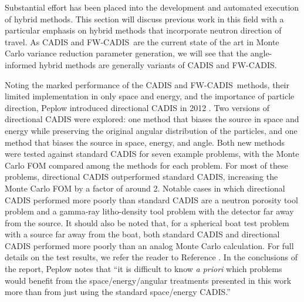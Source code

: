 \documentclass{article} %
\newcommand{\fwc}{\mbox{FW-CADIS}}
\begin{document}
Substantial effort has been placed into the development and automated
execution of hybrid methods. This section will discuss previous work in this
field with a  particular emphasis on hybrid methods  that incorporate neutron
direction of travel. As CADIS and \fwc\ are the current state of the art in
Monte Carlo variance reduction parameter generation, we will see that the
angle-informed hybrid methods are generally variants of CADIS and \fwc.

Noting the marked performance of the CADIS and \fwc\ methods, their limited
implementation in only space and energy, and the importance of particle
direction, Peplow introduced directional CADIS in 2012 \cite{peplow}. Two
versions of directional CADIS were explored: one method that biases the source
in space and energy while preserving the original angular distribution of the
particles, and one method that biases the source in space, energy, and angle.
Both new methods were tested against standard CADIS for seven example
problems, with the Monte Carlo FOM compared among the methods for each
problem. For most of these problems, directional CADIS outperformed standard
CADIS, increasing the Monte Carlo FOM by a factor of around 2. Notable cases
in which directional CADIS performed more poorly than standard CADIS are a
neutron porosity tool problem and a gamma-ray litho-density tool problem with
the detector far away from the source. It should also be noted that, for a
spherical boat test problem with a source far away from the boat, both
standard CADIS and directional CADIS performed more poorly than an analog
Monte Carlo calculation. For full details on the test results, we refer the
reader to Reference \cite{peplow}. In the conclusions of the report, Peplow
notes that ``it is difficult to know \textit{a priori} which problems would
benefit  from the space/energy/angular treatments presented in this work more
than from just using the standard space/energy CADIS.''
\end{document}
